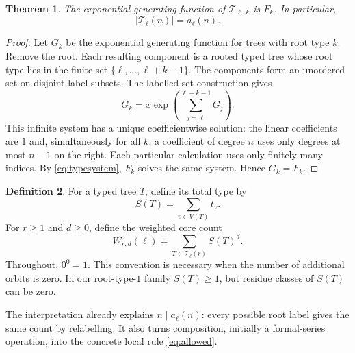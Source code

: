 \documentclass[11pt,letterpaper]{article}
\newtheorem{theorem}{Theorem}[section]
\theoremstyle{definition}
\newtheorem{definition}[theorem]{Definition}
\theoremstyle{remark}
\newcommand{\T}{\mathcal T}
\begin{document}
\begin{theorem}\label{thm:treeinterpretation}
The exponential generating function of $\T_{\ell,k}$ is $F_k$.
In particular,
\begin{equation}\label{eq:treecount}
 |\T_\ell(n)|=a_\ell(n).
\end{equation}
\end{theorem}
\begin{proof}
Let $G_k$ be the exponential generating function for trees with root type
$k$. Remove the root. Each resulting component is a rooted typed tree
whose root type lies in the finite set
$\{\ell,\ldots,\ell+k-1\}$. The components form an unordered set on
disjoint label subsets. The labelled-set construction gives
\[
 G_k=x\exp\left(\sum_{j=\ell}^{\ell+k-1}G_j\right).
\]
This infinite system has a unique coefficientwise solution: the linear
coefficients are $1$ and, simultaneously for all $k$, a coefficient of
degree $n$ uses only degrees at most $n-1$ on the right. Each particular
calculation uses only finitely many indices. By \eqref{eq:typesystem},
$F_k$ solves the same system. Hence $G_k=F_k$.
\end{proof}

\begin{definition}\label{def:weight}
For a typed tree $T$, define its total type by
\[
 S(T)=\sum_{v\in V(T)} t_v.
\]
For $r\ge1$ and $d\ge0$, define the weighted core count
\begin{equation}\label{eq:Wdef}
 W_{r,d}(\ell)=\sum_{T\in\T_\ell(r)} S(T)^d.
\end{equation}
Throughout, $0^0=1$. This convention is necessary when the number of
additional orbits is zero. In our root-type-$1$ family $S(T)\ge1$, but
residue classes of $S(T)$ can be zero.
\end{definition}

The interpretation already explains $n\mid a_\ell(n)$: every possible
root label gives the same count by relabelling. It also turns
composition, initially a formal-series operation, into the concrete
local rule \eqref{eq:allowed}.
\end{document}
